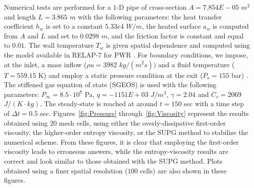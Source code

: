 \documentclass[12pt]{article}
\begin{document}
Numerical tests are performed for a $1$-D pipe of cross-section $A = 7.854E-05$ $m^2$ and length $L=3.865$ $m$ with the following parameters: the heat transfer coefficient $h_w$ is set to a constant $5.33e4$ $W/m$, the heated surface $a_w$ is computed from $A$ and $L$ and set to $0.0298$ $m$, and the friction factor is constant and equal to $0.01$. The wall temperature $T_w$ is given spatial dependence and computed using the model available in RELAP-7 for PWR \cite{Relap7PWR}. 
For boundary conditions, we impose, at the inlet, a mass inflow ($\rho u = 3982$ $kg/(m^2 s))$ and a fluid temperature ($T = 559.15$ K) and employ a static pressure condition at the exit ($P_s = 155$ bar) . The stiffened gas equation of state (SGEOS) is used \cite{SGEOS} with the following parameters: $P_{\infty} = 8.5 \cdot 10^8$ Pa, $q = -1151E+03$ $J/m^3$, $\gamma = 2.04$ and $C_v = 2069$ $J/(K \cdot kg)$. The steady-state is reached at around $t=150$ sec with a time step of $\Delta t = 0.5$ sec. Figures~\ref{fig:Pressure} through~\ref{fig:Viscosity} represent the results obtained using 20 mesh cells, using either the overly-dissipative first-order viscosity, the higher-order entropy viscosity, or the SUPG method to stabilize the numerical scheme. From these figures, it is clear that employing the first-order viscosity leads to erroneous answers, while the entropy-viscosity results are correct and look similar to those obtained with the SUPG method. Plots obtained using a finer spatial resolution ($100$ cells) are also shown in these figures.
\end{document}
